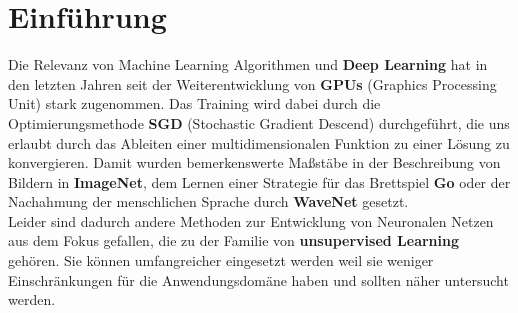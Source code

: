 \chapter{Einführung}


Die Relevanz von Machine Learning Algorithmen und \textbf{Deep Learning}\cite{dloverview} hat in den letzten Jahren seit der Weiterentwicklung von \textbf{GPUs} (Graphics Processing Unit) stark zugenommen. Das Training wird dabei durch die Optimierungsmethode \textbf{SGD} (Stochastic Gradient Descend) durchgeführt, die uns erlaubt durch das Ableiten einer multidimensionalen Funktion zu einer Lösung zu konvergieren. Damit wurden bemerkenswerte Maßstäbe in der Beschreibung von Bildern in \textbf{ImageNet}\cite{NIPS2012_4824}, dem Lernen einer Strategie für das Brettspiel \textbf{Go}\cite{go} oder der Nachahmung der menschlichen Sprache durch \textbf{WaveNet}\cite{wavenet} gesetzt. \\[2mm]
Leider sind dadurch andere Methoden zur Entwicklung von Neuronalen Netzen aus dem Fokus gefallen, die zu der Familie von \textbf{unsupervised Learning} gehören. Sie können umfangreicher eingesetzt werden weil sie weniger Einschränkungen für die Anwendungsdomäne haben und sollten näher untersucht werden.





